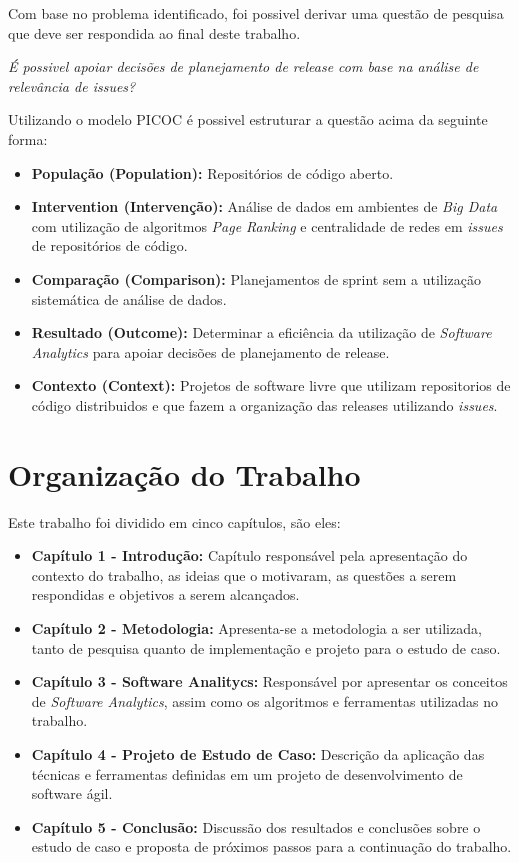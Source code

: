 Com base no problema identificado, foi possivel derivar uma questão de pesquisa
que deve ser respondida ao final deste trabalho.

\begin{center}
    \textit{É possivel apoiar decisões de planejamento de release com base na análise de relevância de issues?} 
\end{center}

Utilizando o modelo PICOC é possivel estruturar a questão acima da seguinte forma:

\begin{itemize}
    \item \textbf{População (Population):} Repositórios de código aberto.
    \item \textbf{Intervention (Intervenção):} Análise de dados em ambientes de
        \textit{Big Data} com utilização de algoritmos \textit{Page Ranking} e
        centralidade de redes em \textit{issues} de repositórios de código.
    \item \textbf{Comparação (Comparison):} Planejamentos de sprint sem a utilização
        sistemática de análise de dados.
    \item \textbf{Resultado  (Outcome):} Determinar a eficiência da utilização de
        \textit{Software Analytics} para apoiar decisões de planejamento de release.
    \item \textbf{Contexto (Context):} Projetos de software livre que utilizam 
        repositorios de código distribuidos e que fazem a organização das releases
        utilizando \textit{issues}.
\end{itemize}


\section{Organização do Trabalho}
Este trabalho foi dividido em cinco capítulos, são eles:

\begin{itemize}
    \item \textbf{Capítulo 1 - Introdução:} Capítulo responsável pela apresentação do contexto do trabalho, as ideias que o motivaram, as questões a serem respondidas e objetivos a serem alcançados.
    \item \textbf{Capítulo 2 - Metodologia:} Apresenta-se a metodologia a ser utilizada, tanto de pesquisa quanto de implementação e projeto para o estudo de caso.
    \item \textbf{Capítulo 3 - Software Analitycs:} Responsável por apresentar os conceitos de \textit{Software Analytics}, assim como os algoritmos e ferramentas utilizadas no trabalho.
    \item \textbf{Capítulo 4 - Projeto de Estudo de Caso:} Descrição da aplicação das técnicas e ferramentas definidas em um projeto de desenvolvimento de software ágil.
    \item \textbf{Capítulo 5 - Conclusão:} Discussão dos resultados e conclusões sobre o estudo de caso e proposta de próximos passos para a continuação do trabalho.
\end{itemize}
